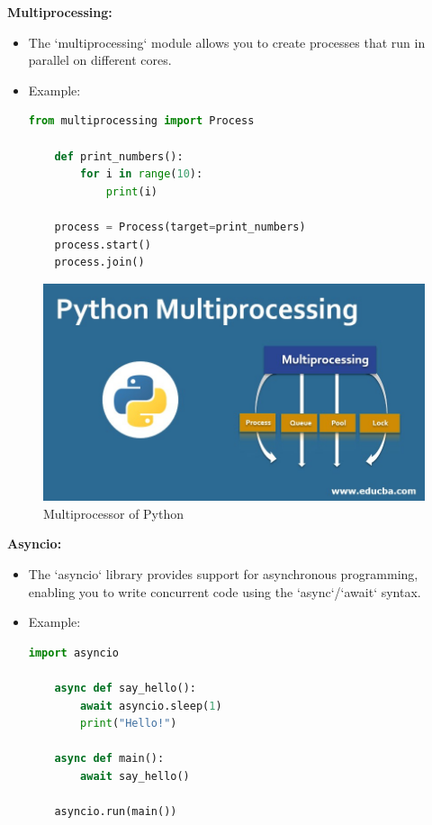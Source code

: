 \documentclass[12pt]{article}
\begin{document}
\textbf{Multiprocessing:}
\begin{itemize}
    \item The `multiprocessing` module allows you to create processes that run in parallel on different cores.
    \item Example:\\
    \begin{lstlisting}[language = Python]
    from multiprocessing import Process

    def print_numbers():
        for i in range(10):
            print(i)
    
    process = Process(target=print_numbers)
    process.start()
    process.join()
    \end{lstlisting}
    
\end{itemize}

\begin{figure}[h!]
\begin{center}
\includegraphics[width=12.5cm]{advanced2.jpg}\\
Multiprocessor of Python
\end{center}
\end{figure}


\textbf{Asyncio:}
\begin{itemize}
    \item The `asyncio` library provides support for asynchronous programming, enabling you to write concurrent code using the `async`/`await` syntax.

    \item Example:\\
    \begin{lstlisting}[language = Python]
    import asyncio

    async def say_hello():
        await asyncio.sleep(1)
        print("Hello!")
    
    async def main():
        await say_hello()
    
    asyncio.run(main())
    \end{lstlisting}
    
\end{itemize}
\end{document}
